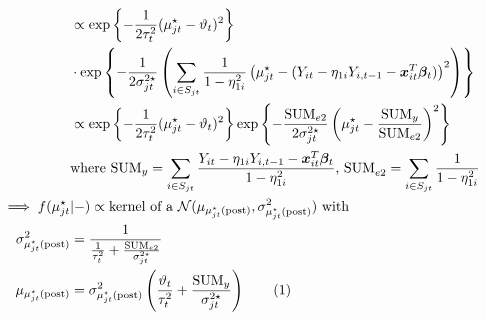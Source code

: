 \documentclass[12pt,	%
	a4paper,		%
	twoside,		%
	openright,		%
	titlepage,%
	]{book}
\theoremstyle{definition}
\begin{document}
\begin{itemize}
\begin{align*}
    &\propto \expp{-\frac{1}{2\tau_t^2}(\mu^\star_{jt}-\theta_t)^2}\\&\cdot \expp{-\frac{1}{2\sigma^{2\star}_{jt}}\left( \sum_{i \in S_{jt}} \frac{1}{1-\eta_{1i}^2}\left(\mu_{jt}^\star - (Y_{it}-\eta_{1i}Y_{i,t-1}-\vec{x}_{it}^T\vec{\beta}_t)\right)^2 \right)} \\
    &\propto \expp{-\frac{1}{2\tau_t^2}(\mu^\star_{jt}-\theta_t)^2} \expp{-\frac{\text{SUM}_{e2}}{2\sigma^{2\star}_{jt}}\left( \mu^\star_{jt}-\frac{\text{SUM}_y}{\text{SUM}_{e2}}\right)^2}\\
    &\text{where SUM}_y = \sum_{i \in S_{jt}} \frac{Y_{it}-\eta_{1i}Y_{i,t-1}-\vec{x}_{it}^T\vec{\beta}_t}{1-\eta_{1i}^2} \text{, SUM}_{e2} = \sum_{i \in S_{jt}} \frac{1}{1-\eta_{1i}^2}\\
\implies f(\mu^\star_{jt}&|-) \propto \text{kernel of a $\N(\mu_{\postp{\mu^\star_{jt}}},\sigma^2_{\postp{\mu^\star_{jt}}})$ with}\\
\sigma^2_{\postp{\mu^\star_{jt}}}&=\frac{1}{\frac{1}{\tau_t^2}+\frac{\text{SUM}_{e2}}{\sigma^{2\star}_{jt}}}\\
%
\mu_{\postp{\mu^\star_{jt}}}&=\sigma^2_{\postp{\mu^\star_{jt}}}\left( \frac{\theta_t}{\tau_t^2} + \frac{\text{SUM}_y}{\sigma_{jt}^{2\star}} \right)
\tag{\stepcounter{equation}\theequation}
\end{align*}



\end{itemize}
\end{document}
